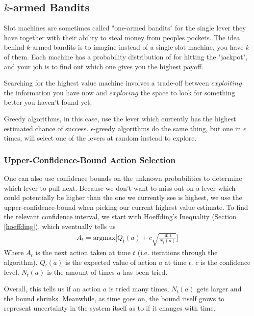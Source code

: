 \subsection{$k$-armed Bandits}
Slot machines are sometimes called "one-armed bandits" for the single lever they have together with their ability to steal money from peoples pockets. The idea behind $k$-armed bandits is to imagine instead of a single slot machine, you have $k$ of them. Each machine has a probability distribution of for hitting the "jackpot", and your job is to find out which one gives you the highest payoff.

Searching for the highest value machine involves a trade-off between $exploiting$ the information you have now and $exploring$ the space to look for something better you haven't found yet.

Greedy algorithms, in this case, use the lever which currently has the highest estimated chance of success. $\epsilon$-greedy algorithms do the same thing, but one in $\epsilon$ times, will select one of the levers at random instead to explore.


\subsubsection{Upper-Confidence-Bound Action Selection}

One can also use confidence bounds on the unknown probabilities to determine which lever to pull next. Because we don't want to miss out on a lever which could potentially be higher than the one we currently see is highest, we use the upper-confidence-bound when picking our current highest value estimate. To find the relevant confidence interval, we start with Hoeffding's Inequality (Section \ref{hoeffding}), which eventually tells us
\begin{align}
	A_t = \textrm{argmax}\Big[Q_t(a) + c\sqrt{\frac{\ln t}{N_t(a)}}\Big]
\end{align}
Where $A_t$ is the next action taken at time $t$ (i.e. iterations through the algorithm). $Q_t(a)$ is the expected value of action $a$ at time $t$. $c$ is the confidence level. $N_t(a)$ is the amount of times $a$ has been tried.

Overall, this tells us if an action $a$ is tried many times, $N_t(a)$ gets larger and the bound shrinks. Meanwhile, as time goes on, the bound itself grows to represent uncertainty in the system itself as to if it changes with time.


